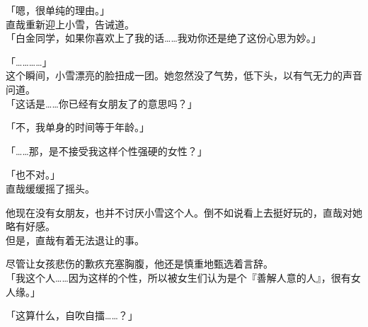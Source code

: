 「嗯，很单纯的理由。」\\

直哉重新迎上小雪，告诫道。\\

「白金同学，如果你喜欢上了我的话……我劝你还是绝了这份心思为妙。」

「…………」\\

这个瞬间，小雪漂亮的脸扭成一团。她忽然没了气势，低下头，以有气无力的声音问道。\\

「这话是……你已经有女朋友了的意思吗？」

「不，我单身的时间等于年龄。」

「……那，是不接受我这样个性强硬的女性？」

「也不对。」\\

直哉缓缓摇了摇头。

他现在没有女朋友，也并不讨厌小雪这个人。倒不如说看上去挺好玩的，直哉对她略有好感。\\

但是，直哉有着无法退让的事。

尽管让女孩悲伤的歉疚充塞胸腹，他还是慎重地甄选着言辞。\\

「我这个人……因为这样的个性，所以被女生们认为是个『善解人意的人』，很有女人缘。」

「这算什么，自吹自擂……？」

